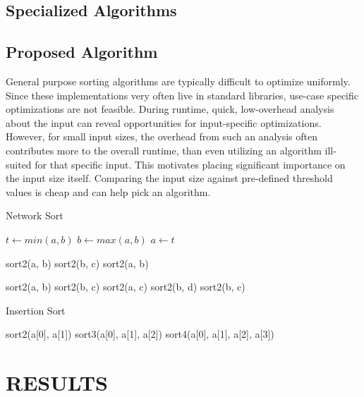 \documentclass[letter, 12pt, conference]{ieeeconf}
\begin{document}
\subsection{Specialized Algorithms}

\subsection{Proposed Algorithm}

General purpose sorting algorithms are typically difficult to optimize
uniformly. Since these implementations very often live in standard libraries,
use-case specific optimizations are not feasible. During runtime, quick,
low-overhead analysis about the input can reveal opportunities for
input-specific optimizations. However, for small input sizes, the overhead from
such an analysis often contributes more to the overall runtime, than even
utilizing an algorithm ill-suited for that specific input. This motivates
placing significant importance on the input size itself. Comparing the input
size against pre-defined threshold values is cheap and can help pick an
algorithm.

\begin{algorithm}
	\caption{Network Sort}
	\label{alg:network_sort}
	\begin{algorithmic}
		\State $t \gets min(a, b)$
		\State $b \gets max(a, b)$
		\State $a \gets t$
		\EndProcedure

		\State sort2(a, b)
		\State sort2(b, c)
		\State sort2(a, b)
		\EndProcedure

		\State sort2(a, b)
		\State sort2(b, c)
		\State sort2(a, c)
		\State sort2(b, d)
		\State sort2(b, c)
		\EndProcedure
	\end{algorithmic}
\end{algorithm}

\begin{algorithm}
	\caption{Insertion Sort}
	\label{alg:insertion_sort}
	\begin{algorithmic}
		\Procedure{ins\_sort}{a, n}
		\If {$n == 2$}
		\State sort2(a[0], a[1])
		\ElsIf {$n == 3$}
		\State sort3(a[0], a[1], a[2])
		\ElsIf {$n == 4$}
		\State sort4(a[0], a[1], a[2], a[3])
		\Endif

		\EndProcedure
	\end{algorithmic}
\end{algorithm}


\section{RESULTS}
\end{document}

